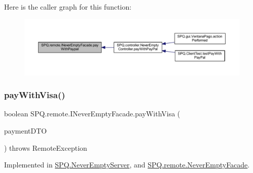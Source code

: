 Here is the caller graph for this function\+:\nopagebreak
\begin{figure}[H]
\begin{center}
\leavevmode
\includegraphics[width=350pt]{interface_s_p_q_1_1remote_1_1_i_never_empty_facade_a2d34c64f91537d8c7138094e418de785_icgraph}
\end{center}
\end{figure}
\mbox{\label{interface_s_p_q_1_1remote_1_1_i_never_empty_facade_a3b7058d95e7b73bdcc09220ecfc2d744}} 
\subsubsection{\texorpdfstring{pay\+With\+Visa()}{payWithVisa()}}
{\footnotesize\ttfamily boolean S\+P\+Q.\+remote.\+I\+Never\+Empty\+Facade.\+pay\+With\+Visa (\begin{DoxyParamCaption}\item[{\mbox{\hyperlink{class_s_p_q_1_1dto_1_1_payment_d_t_o}{Payment\+D\+TO}}}]{payment\+D\+TO }\end{DoxyParamCaption}) throws Remote\+Exception}



Implemented in \mbox{\hyperlink{class_s_p_q_1_1_never_empty_server_a455fa773e66917007842f9a92243ffa8}{S\+P\+Q.\+Never\+Empty\+Server}}, and \mbox{\hyperlink{class_s_p_q_1_1remote_1_1_never_empty_facade_a0ff9201cf33cb76c43dd85c892af93ba}{S\+P\+Q.\+remote.\+Never\+Empty\+Facade}}.


